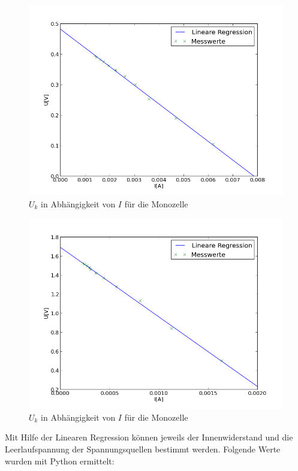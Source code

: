 \documentclass[11pt,ngerman,a4paper]{article}
\begin{document}
\begin{figure}
\centering
\includegraphics[scale=1.00]{Plot2.png}
\caption{$U_k$ in Abh\"angigkeit von $I$ f\"ur die Monozelle}
\label{Plot2}
\end{figure}
\begin{figure}
\centering
\includegraphics[scale=1.00]{Plot3.png}
\caption{$U_k$ in Abh\"angigkeit von $I$ f\"ur die Monozelle}
\label{Plot3}
\end{figure}
\newpage
\noindent
Mit Hilfe der Linearen Regression können jeweils der Innenwiderstand und die Leerlaufspannung der Spannungsquellen bestimmt werden. Folgende Werte wurden mit Python ermittelt:
\end{document}
